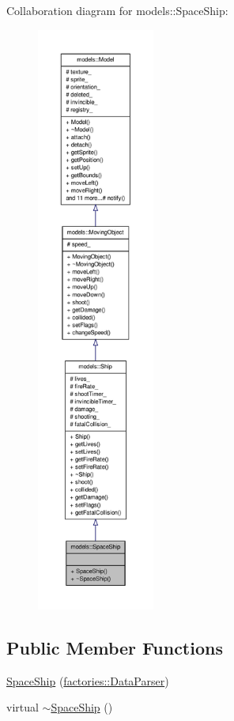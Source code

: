 \-Collaboration diagram for models\-:\-:\-Space\-Ship\-:\nopagebreak
\begin{figure}[H]
\begin{center}
\leavevmode
\includegraphics[height=550pt]{d6/da5/classmodels_1_1SpaceShip__coll__graph}
\end{center}
\end{figure}
\subsection*{\-Public \-Member \-Functions}
\begin{DoxyCompactItemize}
\item 
\hyperlink{classmodels_1_1SpaceShip_a7f7ca300732cc4871405dc784b29943d}{\-Space\-Ship} (\hyperlink{classfactories_1_1DataParser}{factories\-::\-Data\-Parser})
\item 
virtual \hyperlink{classmodels_1_1SpaceShip_a851a37ae8e12afea56446e21d95e683e}{$\sim$\-Space\-Ship} ()
\end{DoxyCompactItemize}


